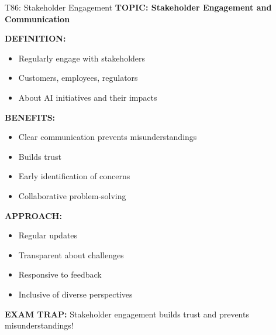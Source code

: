 \documentclass[8pt]{beamer}
\begin{document}
	\begin{frame}{T86: Stakeholder Engagement}
		\fontsize{6.5}{7.5}\selectfont
		\textbf{TOPIC: Stakeholder Engagement and Communication}
		
		\vspace{0.1cm}
		\textbf{DEFINITION:}
		\begin{itemize}
			\item Regularly engage with stakeholders
			\item Customers, employees, regulators
			\item About AI initiatives and their impacts
		\end{itemize}
		
		\vspace{0.1cm}
		\textbf{BENEFITS:}
		\begin{itemize}
			\item Clear communication prevents misunderstandings
			\item Builds trust
			\item Early identification of concerns
			\item Collaborative problem-solving
		\end{itemize}
		
		\vspace{0.1cm}
		\textbf{APPROACH:}
		\begin{itemize}
			\item Regular updates
			\item Transparent about challenges
			\item Responsive to feedback
			\item Inclusive of diverse perspectives
		\end{itemize}
		
		\textcolor{myred}{\textbf{EXAM TRAP:}} Stakeholder engagement \textcolor{myblue}{builds trust and prevents misunderstandings}!
	\end{frame}
	
\end{document}

